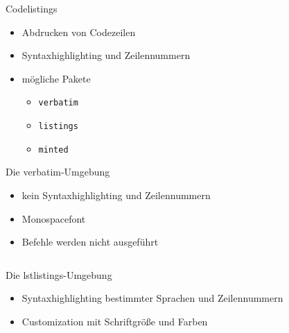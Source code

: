\documentclass[presentation,aspectratio=169]{beamer}
\begin{document}
\begin{frame}[fragile]{Codelistings}
  \begin{itemize}
    \item Abdrucken von Codezeilen
    \item Syntaxhighlighting und Zeilennummern
    \item mögliche Pakete
      \begin{itemize}
        \item \verb|verbatim|
        \item \verb|listings|
        \item \verb|minted|
      \end{itemize}
  \end{itemize}
\end{frame}

\begin{frame}[fragile]{Die verbatim-Umgebung}
  \begin{itemize}
    \item kein Syntaxhighlighting und Zeilennummern
    \item Monospacefont
    \item Befehle werden nicht ausgeführt
  \end{itemize}
  \begin{minipage}{.4\textwidth}
    
  \end{minipage}
  \hfill
  \begin{minipage}{.5\textwidth}
    \inputminted{latex}{codebeispiele/listings-verbatim.tex}
  \end{minipage}
\end{frame}

\begin{frame}[fragile]{Die lstlistings-Umgebung}
  \begin{itemize}
    \item Syntaxhighlighting bestimmter Sprachen und Zeilennummern
    \item Customization mit Schriftgröße und Farben
  \end{itemize}
  \begin{minipage}{.4\textwidth}
    
  \end{minipage}
  \hfill
  \begin{minipage}{.5\textwidth}
    \inputminted{latex}{codebeispiele/listings-lstlistings.tex}
  \end{minipage}
\end{frame}
\end{document}
